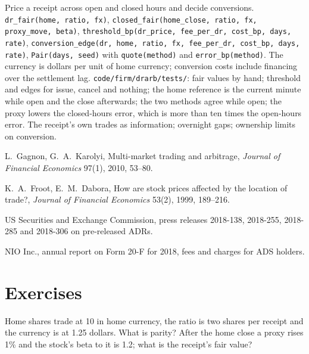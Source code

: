 \begin{build}
 Price a receipt across open and closed hours and decide conversions.
 \texttt{dr\_fair(home, ratio, fx)}, \texttt{closed\_fair(home\_close, ratio, fx, proxy\_move, beta)},
\texttt{threshold\_bp(dr\_price, fee\_per\_dr, cost\_bp, days, rate)}, \texttt{conversion\_edge(dr, home, ratio, fx, fee\_per\_dr, cost\_bp, days,
rate)}, \texttt{Pair(days, seed)} with \texttt{quote(method)} and \texttt{error\_bp(method)}.
 The currency is dollars per unit of home currency; conversion costs include financing over the settlement lag.
 \texttt{code/firm/drarb/tests/}: fair values by hand; threshold and edges for issue, cancel and nothing; the home
reference is the current minute while open and the close afterwards; the two methods agree while open; the proxy lowers the closed-hours error, which
is more than ten times the open-hours error.
 The receipt's own trades as information; overnight gaps; ownership limits on conversion.
\end{build}

\begin{omsources}
\item L.~Gagnon, G.~A.~Karolyi, Multi-market trading and arbitrage, \emph{Journal of Financial Economics} 97(1), 2010, 53--80.
\item K.~A.~Froot, E.~M.~Dabora, How are stock prices affected by the location of trade?, \emph{Journal of Financial Economics} 53(2), 1999,
189--216.
\item US Securities and Exchange Commission, press releases 2018-138, 2018-255, 2018-285 and 2018-306 on pre-released ADRs.
\item NIO Inc., annual report on Form 20-F for 2018, fees and charges for ADS holders.
\end{omsources}

\section{Exercises}

\begin{exercise}[$\star$]\label{exo:hf:depositary-receipts-and-dual-listings:1}
Home shares trade at 10 in home currency, the ratio is two shares per receipt and the currency is at 1.25 dollars. What is parity? After the home
close a proxy rises 1\% and the stock's beta to it is 1.2; what is the receipt's fair value?
\end{exercise}


